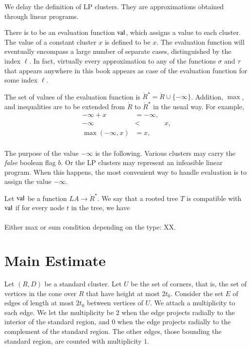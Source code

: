 We delay the definition of LP clusters.  They are approximations
obtained through linear programs.



There is to be an evaluation function ${\operatorname{val}}$, which assigns a value
to each cluster.  The value of a constant cluster $x$ is defined to be $x$.
The evaluation function will eventually encompass a large number of
separate cases, distinguished by the index $\ell$.  
In fact, virtually every approximation
to any of the functions $\sigma$ and $\tau$ that appears anywhere
in this book appears as case of the evaluation function for some index
$\ell$.

The set of values of the evaluation function is 
$\ring{R}^\star = \ring{R}\cup\{-\infty\}$.
Addition, $\max$, and inequalities are to be extended from
$\ring{R}$ to $\ring{R}^\star$ in the usual way.  For example,
  $$
  \begin{array}{lll}
    -\infty + x &= -\infty,\\
    -\infty &< & x,\\
    \max(-\infty,x) &= x,\\
    \end{array}
  $$

The purpose of the value $-\infty$ is the following.  Various
clusters may carry the {\it false} boolean flag $b$.  Or the
LP clusters may represent an infeasible linear program.  When
this happens, the most convenient way to handle evaluation is
to assign the value $-\infty$.

\begin{definition}
Let ${\operatorname{val}}$
be a function $LA\to \ring{R}^\star$.  We say that
a rooted tree $T$ is compatible with ${\operatorname{val}}$ if for every
node $t$ in the tree, we have
   $$
   \begin{array}{lll}
     \end{array}
   $$
\end{definition}

Either max or sum condition depending on the type: XX.





\section{Main Estimate} %
    \label{sec:the-main-theorem}

Let $(R,D)$ be a standard cluster. Let $U$ be the set of corners,
that is, the set of vertices in the cone over $R$ that have height
at most $2t_0$.  Consider the set $E$ of edges of length at most
$2t_0$ between vertices of $U$. We attach a multiplicity to each
edge. We let the multiplicity be $2$ when the edge projects
radially to the interior of the standard region, and $0$ when the
edge projects radially to the complement of the standard region.
The other edges, those bounding the standard region, are counted
with multiplicity $1$.

